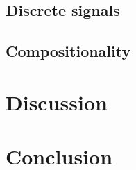 \documentclass[11pt,a4paper]{article}
\begin{document}

\subsection{Discrete signals}

\subsection{Compositionality}

\section{Discussion}

\section{Conclusion}



\cite{Steinert-Threlkeld2019}



\end{document}
